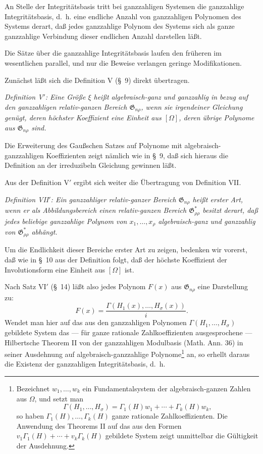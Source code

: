 \documentclass[11pt]{article}
\providecommand{\Gdom}{\mathfrak{G}}
\begin{document}
An Stelle der Integritätsbasis tritt bei ganzzahligen Systemen die ganzzahlige Integritätsbasis, d.~h. eine endliche Anzahl von ganzzahligen Polynomen des Systems derart, daß jedes ganzzahlige Polynom des Systems sich als ganze ganzzahlige Verbindung dieser endlichen Anzahl darstellen läßt.

Die Sätze über die ganzzahlige Integritätsbasis laufen den früheren im wesentlichen parallel, und nur die Beweise verlangen geringe Modifikationen.

Zunächst läßt sich die Definition V (\S\ 9) direkt übertragen.

\emph{Definition V$'$: Eine Größe $\xi$ heißt algebraisch-ganz und ganzzahlig in bezug auf den ganzzahligen relativ-ganzen Bereich $\Gdom_{n\rho}$, wenn sie irgendeiner Gleichung genügt, deren höchster Koeffizient eine Einheit aus $[\Omega]$, deren übrige Polynome aus $\Gdom_{n\rho}$ sind.}

Die Erweiterung des Gaußschen Satzes auf Polynome mit algebraisch-ganzzahligen Koeffizienten zeigt nämlich wie in \S\ 9, daß sich hieraus die Definition an der irreduzibeln Gleichung gewinnen läßt.

Aus der Definition V$'$ ergibt sich weiter die Übertragung von Definition VII.

\emph{Definition VII$'$: Ein ganzzahliger relativ-ganzer Bereich $\Gdom_{n\rho}$ heißt erster Art, wenn er als Abbildungsbereich einen relativ-ganzen Bereich $\Gdom^*_{\rho\rho}$ besitzt derart, daß jedes beliebige ganzzahlige Polynom von $x_1,
\ldots,x_\rho$ algebraisch-ganz und ganzzahlig von $\Gdom^*_{\rho\rho}$ abhängt.}

Um die Endlichkeit dieser Bereiche erster Art zu zeigen, bedenken wir vorerst, daß wie in \S\ 10 aus der Definition folgt, daß der höchste Koeffizient der Involutionsform eine Einheit aus $[\Omega]$ ist.

Nach Satz VI$'$ (\S\ 14) läßt also jedes Polynom $F(x)$ aus $\Gdom_{n\rho}$ eine Darstellung zu:
\[
  F(x)=\frac{\Gamma(H_1(x),\ldots,H_\sigma(x))}{i}.
\]
Wendet man hier auf das aus den ganzzahligen Polynomen $\Gamma(H_1,
\ldots,H_\sigma)$ gebildete System das --- für ganze rationale Zahlkoeffizienten ausgesprochene --- Hilbertsche Theorem II von der ganzzahligen Modulbasis (Math. Ann. 36) in seiner Ausdehnung auf algebraisch-ganzzahlige Polynome\footnote{Bezeichnet $w_1,
\ldots,w_k$ ein Fundamentalsystem der algebraisch-ganzen Zahlen aus $\Omega$, und setzt man
\[
  \Gamma(H_1,
\ldots,H_\sigma)=\Gamma_1(H)w_1+\cdots+\Gamma_k(H)w_k,
\]
so haben $\Gamma_1(H),
\ldots,\Gamma_k(H)$ ganze rationale Zahlkoeffizienten. Die Anwendung des Theorems II auf das aus den Formen $v_1\Gamma_1(H)+\cdots+v_k\Gamma_k(H)$ gebildete System zeigt unmittelbar die Gültigkeit der Ausdehnung.} an, so erhellt daraus die Existenz der ganzzahligen Integritätsbasis, d.~h.
\end{document}
